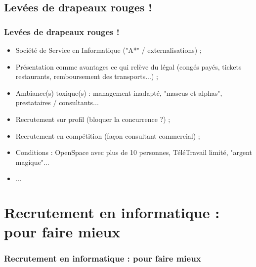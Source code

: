 \documentclass[slidetop,11pt]{beamer}
\begin{document}
\subsection{Lev{\'e}es de drapeaux rouges !}
\begin{frame}
	\frametitle{Lev{\'e}es de drapeaux rouges !}
	\begin{itemize}
		\item Soci{\'e}t{\'e} de Service en Informatique ("A*" / externalisations) ; 
		\item Pr{\'e}sentation comme avantages ce qui rel{\`e}ve du l{\'e}gal (cong{\'e}s pay{\'e}s, tickets restaurants, remboursement des transports...) ; 
		\item Ambiance(s) toxique(s) : management inadapt{\'e}, "mascus et alphas", prestataires / consultants...
		\item Recrutement sur profil (bloquer la concurrence ?) ; 
		\item Recrutement en comp{\'e}tition (fa\c{c}on consultant commercial) ; 
		\item Conditions : OpenSpace avec plus de 10 personnes, T{\'e}l{\'e}Travail limit{\'e}, "argent magique"...
		\item ... 
	\end{itemize}
\end{frame}


\section{Recrutement en informatique : pour faire mieux}
\begin{frame}
	\frametitle{Recrutement en informatique : pour faire mieux}
	\tableofcontents[sections=3,currentsection,subsectionstyle=show/shaded/hide] %
\end{frame}
\end{document}

